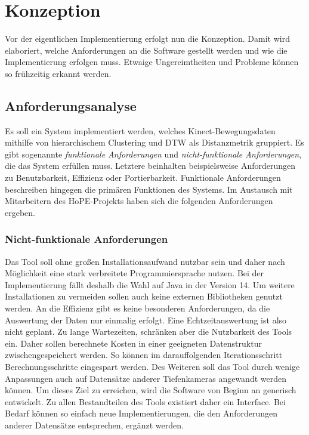 \chapter{Konzeption}
\label{chapter4}
Vor der eigentlichen Implementierung erfolgt nun die Konzeption.
Damit wird elaboriert, welche Anforderungen an die Software gestellt werden
und wie die Implementierung erfolgen muss.
Etwaige Ungereimtheiten und Probleme können so frühzeitig erkannt werden.

\section{Anforderungsanalyse}
\label{4-Anforderungsanalyse}
Es soll ein System implementiert werden,
welches Kinect-Bewegungsdaten mithilfe von hierarchischem Clustering
und \ac{DTW} als Distanzmetrik gruppiert.
Es gibt sogenannte \emph{funktionale Anforderungen} und \emph{nicht-funktionale Anforderungen},
die das System erfüllen muss.
Letztere beinhalten beispielsweise Anforderungen zu Benutzbarkeit, Effizienz oder Portierbarkeit.
Funktionale Anforderungen beschreiben hingegen die primären Funktionen des Systems.
Im Austausch mit Mitarbeitern des HoPE-Projekts haben sich die folgenden Anforderungen ergeben.

\subsection{Nicht-funktionale Anforderungen}
\label{4-NichtFunktionaleAnforderungen}
Das Tool soll ohne großen Installationsaufwand nutzbar sein
und daher nach Möglichkeit eine stark verbreitete Programmiersprache nutzen.
Bei der Implementierung fällt deshalb die Wahl auf Java in der Version 14.
Um weitere Installationen zu vermeiden sollen auch keine externen Bibliotheken genutzt werden.
An die Effizienz gibt es keine besonderen Anforderungen,
da die Auswertung der Daten nur einmalig erfolgt.
Eine Echtzeitauswertung ist also nicht geplant.
Zu lange Wartezeiten, schränken aber die Nutzbarkeit des Tools ein.
Daher sollen berechnete Kosten in einer geeigneten Datenstruktur zwischengespeichert werden.
So können im darauffolgenden Iterationsschritt Berechnungsschritte eingespart werden.
Des Weiteren soll das Tool durch wenige Anpassungen auch auf Datensätze anderer Tiefenkameras angewandt werden können.
Um dieses Ziel zu erreichen, wird die Software von Beginn an generisch entwickelt.
Zu allen Bestandteilen des Tools existiert daher ein Interface.
Bei Bedarf können so einfach neue Implementierungen,
die den Anforderungen anderer Datensätze entsprechen, ergänzt werden.

